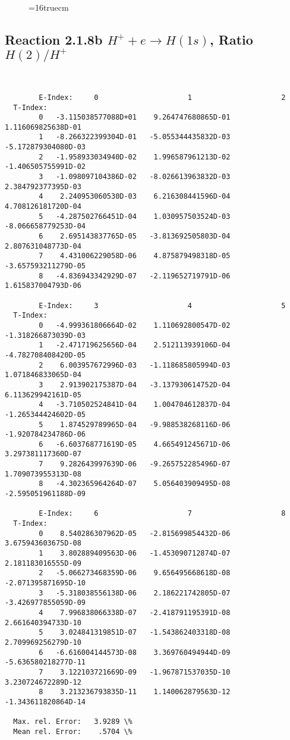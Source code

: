 \documentclass[12pt,dvipdfmx]{article}
\begin{document}
\begin{figure} \label{2.1.8ra}
\epsfxsize=16truecm
\end{figure}
\newpage



\subsection{
Reaction 2.1.8b  $H^+ + e \rightarrow H(1s) $,  Ratio $H(2)/H^+$
}

\begin{small}\begin{verbatim}


        E-Index:     0                     1                     2
  T-Index:
        0   -3.115038577088D+01    9.264747680865D-01    1.116069825638D-01
        1   -8.266322399304D-01   -5.055344435832D-03   -5.172879304080D-03
        2   -1.958933034940D-02    1.996587961213D-02   -1.406505755991D-02
        3   -1.098097104386D-02   -8.026613963832D-03    2.384792377395D-03
        4    2.240953060530D-03    6.216308441596D-04    4.708126181720D-04
        5   -4.287502766451D-04    1.030957503524D-03   -8.066658779253D-04
        6    2.695143837765D-05   -3.813692505803D-04    2.807631048773D-04
        7    4.431006229058D-06    4.875879498318D-05   -3.657593211279D-05
        8   -4.836943342929D-07   -2.119652719791D-06    1.615837004793D-06

        E-Index:     3                     4                     5
  T-Index:
        0   -4.999361806664D-02    1.110692800547D-02   -1.318266873039D-03
        1   -2.471719625656D-04    2.512113939106D-04   -4.782708408420D-05
        2    6.003957672996D-03   -1.118685805994D-03    1.071846833065D-04
        3    2.913902175387D-04   -3.137930614752D-04    6.113629942161D-05
        4   -3.710502524841D-04    1.004704612837D-04   -1.265344424602D-05
        5    1.874529789965D-04   -9.988538268116D-06   -1.920784234786D-06
        6   -6.603768771619D-05    4.665491245671D-06    3.297381117360D-07
        7    9.282643997639D-06   -9.265752285496D-07    1.709073955313D-08
        8   -4.302365964264D-07    5.056403909495D-08   -2.595051961188D-09

        E-Index:     6                     7                     8
  T-Index:
        0    8.540286307962D-05   -2.815699854432D-06    3.675943603675D-08
        1    3.802889409563D-06   -1.453090712874D-07    2.181183016555D-09
        2   -5.066273468359D-06    9.656495668618D-08   -2.071395871695D-10
        3   -5.318038556138D-06    2.186221742805D-07   -3.426977855059D-09
        4    7.996838066338D-07   -2.418791195391D-08    2.661640394733D-10
        5    3.024841319851D-07   -1.543862403318D-08    2.709969256279D-10
        6   -6.616004144573D-08    3.369760494944D-09   -5.636580218277D-11
        7    3.122103721669D-09   -1.967871537035D-10    3.230724672289D-12
        8    3.213236793835D-11    1.140062879563D-12   -1.343611820864D-14

  Max. rel. Error:   3.9289 \%
  Mean rel. Error:    .5704 \%

\end{verbatim}\end{small}
\end{document}

